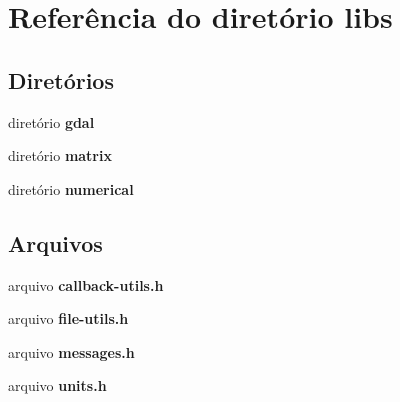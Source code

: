 \section{Referência do diretório libs}
\label{dir_fd6d6d0ff3055902280fbc3e0cef43c4}
\subsection*{Diretórios}
\begin{DoxyCompactItemize}
\item 
diretório {\bf gdal}
\item 
diretório {\bf matrix}
\item 
diretório {\bf numerical}
\end{DoxyCompactItemize}
\subsection*{Arquivos}
\begin{DoxyCompactItemize}
\item 
arquivo {\bf callback-\/utils.\+h}
\item 
arquivo {\bf file-\/utils.\+h}
\item 
arquivo {\bf messages.\+h}
\item 
arquivo {\bf units.\+h}
\end{DoxyCompactItemize}
